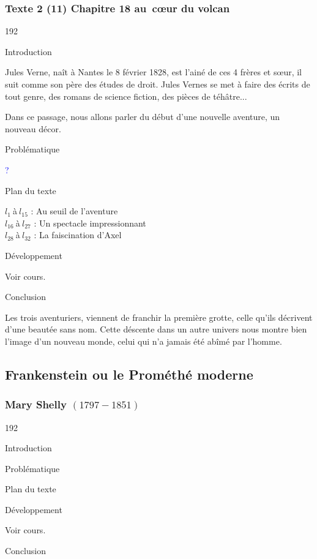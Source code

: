 \documentclass[12pt,a4paper]{article}
\begin{document}
				\subsubsection{Texte 2 (11) Chapitre 18 au~c\oe ur du volcan}
\begin{dingautolist}{192}

\item Introduction \par
Jules Verne, naît à Nantes le 8 février 1828, est l'ainé de ces 4 frères et s\oe ur, il suit comme son père des études de droit. Jules Vernes se met à faire des écrits de tout genre, des romans de science fiction, des pièces de téhâtre...\par
Dans ce passage, nous allons parler du début d'une nouvelle aventure, un nouveau décor. 


\item Probl\'ematique \par
	\textcolor{blue}{?}
\item Plan du texte \par
	$l_{1}~$\`a$~l_{15}$ : Au seuil de l'aventure\\
    $l_{16}~$\`a$~l_{27}$ : Un spectacle impressionnant\\
    $l_{28}~$\`a$~l_{32}$ : La faiscination d'Axel

\item D\'eveloppement \par
        Voir cours.

\item Conclusion \par
Les trois aventuriers, viennent de franchir la première grotte, celle qu'ils décrivent d'une beautée sans nom. Cette déscente dans un autre univers nous montre bien l'image d'un nouveau monde, celui qui n'a jamais été abîmé par l'homme. 

\end{dingautolist}

\subsection{Frankenstein ou le Prom\'eth\'e moderne}
				\subsubsection{Mary Shelly $(1797 - 1851) $}
\begin{dingautolist}{192}

\item Introduction \par
\item Probl\'ematique \par
\item Plan du texte \par
\item D\'eveloppement \par
        Voir cours.

\item Conclusion \par

\end{dingautolist}
\end{document}
